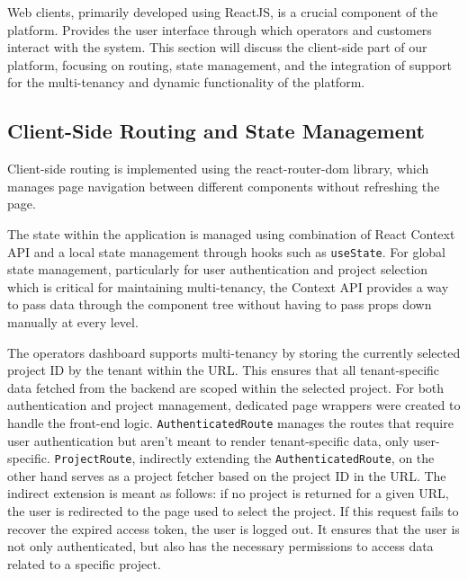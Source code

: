 Web clients, primarily developed using ReactJS, is a crucial component of the platform.
Provides the user interface through which operators and customers interact with the system.
This section will discuss the client-side part of our platform, focusing on routing, state management, and the integration of support for the multi-tenancy and dynamic functionality of the platform.

\subsection{Client-Side Routing and State Management}
\label{subsec:client-side-routing-state}
Client-side routing is implemented using the \gls{react-router-dom} library, which manages page navigation between different components without refreshing the page. 

The state within the application is managed using combination of React Context API and a local state management through hooks such as \texttt{useState}.
For global state management, particularly for user authentication and project selection which is critical for maintaining multi-tenancy, the Context API provides a way to pass data through the component tree without having to pass props down manually at every level.

The operators dashboard supports multi-tenancy by storing the currently selected project ID by the tenant within the URL.
This ensures that all tenant-specific data fetched from the backend are scoped within the selected project.
For both authentication and project management, dedicated page wrappers were created to handle the front-end logic.
\texttt{AuthenticatedRoute} manages the routes that require user authentication but aren't meant to render tenant-specific data, only user-specific.
\texttt{ProjectRoute}, indirectly extending the \texttt{AuthenticatedRoute}, on the other hand serves as a project fetcher based on the project ID in the URL.
The indirect extension is meant as follows: if no project is returned for a given URL, the user is redirected to the page used to select the project. If this request fails to recover the expired access token, the user is logged out.
It ensures that the user is not only authenticated, but also has the necessary permissions to access data related to a specific project.



